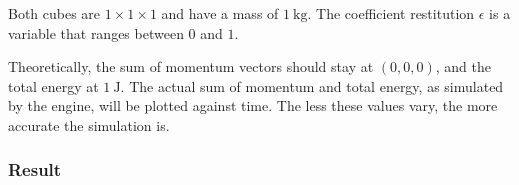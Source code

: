 \documentclass[12pt,a4paper,twoside,openright]{report}
\begin{document}
Both cubes are $1\times 1\times 1$ and have a mass of $\SI{1}{\kg}$. The coefficient restitution $\epsilon$ is a variable that ranges between $0$ and $1$.

\begin{center}
\end{center}

Theoretically, the sum of momentum vectors should stay at $(0, 0, 0)$, and the total energy at $\SI{1}{\J}$.
The actual sum of momentum and total energy, as simulated by the engine, will be plotted against time.
The less these values vary, the more accurate the simulation is.

\subsubsection{Result}

\begin{figure}
    \captionsetup{labelsep=none}
    \begin{center}
    \end{center}
    \caption{}
    \label{ev1}
\end{figure}

    \begin{figure} 
        \captionsetup{labelsep=none}
        \begin{center}
          \end{center}
          \caption{}
          \label{ev2}
        \end{figure}
            
\end{document}
